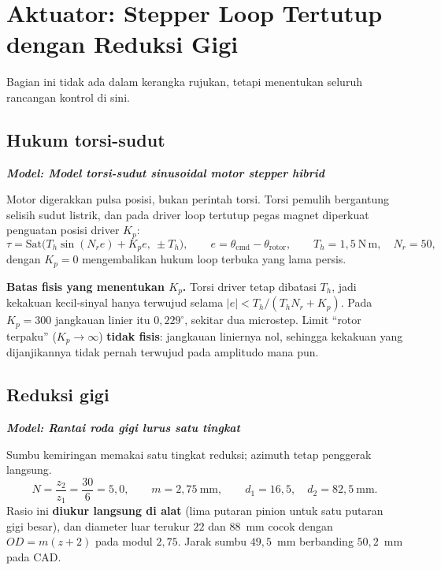 \documentclass[11pt,a4paper]{article}
\newcommand{\degg}{^\circ}
\newcommand{\model}[1]{\textbf{\textit{Model: #1}}}
\begin{document}
\section{Aktuator: Stepper Loop Tertutup dengan Reduksi Gigi}
\label{sec:step}

Bagian ini tidak ada dalam kerangka rujukan, tetapi menentukan seluruh rancangan kontrol di sini.

\subsection{Hukum torsi-sudut}

\model{Model torsi-sudut sinusoidal motor stepper hibrid}

Motor digerakkan pulsa posisi, bukan perintah torsi. Torsi pemulih bergantung selisih sudut listrik,
dan pada driver loop tertutup pegas magnet diperkuat penguatan posisi driver $K_p$:
\begin{equation}
\tau = \mathrm{Sat}\!\Big( T_h \sin( N_r e ) + K_p e, \ \pm T_h \Big),
\qquad e = \theta_{\mathrm{cmd}} - \theta_{\mathrm{rotor}},
\qquad T_h = 1{,}5 \ \mathrm{N\,m}, \quad N_r = 50,
\label{eq:stepper}
\end{equation}
dengan $K_p = 0$ mengembalikan hukum loop terbuka yang lama persis.

\textbf{Batas fisis yang menentukan $K_p$.} Torsi driver tetap dibatasi $T_h$, jadi kekakuan kecil-sinyal
hanya terwujud selama $|e| < T_h/(T_h N_r + K_p)$. Pada $K_p = 300$ jangkauan linier itu $0{,}229\degg$,
sekitar dua microstep. Limit ``rotor terpaku'' ($K_p \to \infty$) \textbf{tidak fisis}: jangkauan liniernya
nol, sehingga kekakuan yang dijanjikannya tidak pernah terwujud pada amplitudo mana pun.

\subsection{Reduksi gigi}

\model{Rantai roda gigi lurus satu tingkat}

Sumbu kemiringan memakai satu tingkat reduksi; azimuth tetap penggerak langsung.
\begin{equation}
N = \frac{z_2}{z_1} = \frac{30}{6} = 5{,}0, \qquad m = 2{,}75 \ \mathrm{mm},
\qquad d_1 = 16{,}5, \quad d_2 = 82{,}5 \ \mathrm{mm}.
\end{equation}
Rasio ini \textbf{diukur langsung di alat} (lima putaran pinion untuk satu putaran gigi besar), dan
diameter luar terukur $22$ dan $88$~mm cocok dengan $OD = m(z+2)$ pada modul $2{,}75$. Jarak sumbu
$49{,}5$~mm berbanding $50{,}2$~mm pada CAD.
\end{document}
